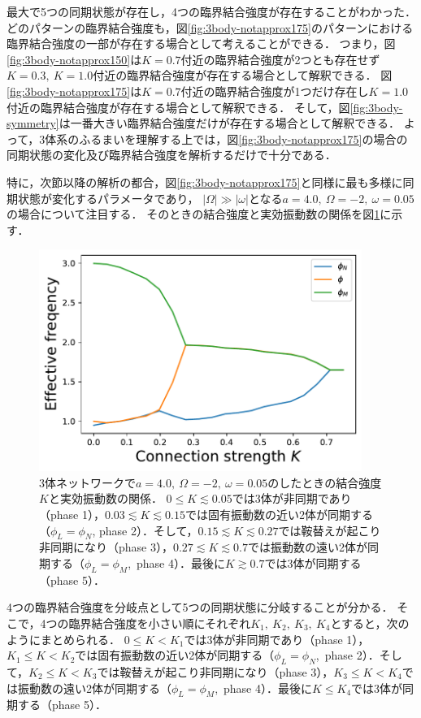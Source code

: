 \documentclass[../main]{subfiles}
\begin{document}
最大で5つの同期状態が存在し，4つの臨界結合強度が存在することがわかった．
どのパターンの臨界結合強度も，図\ref{fig:3body-notapprox175}のパターンにおける臨界結合強度の一部が存在する場合として考えることができる．
つまり，図\ref{fig:3body-notapprox150}は$K=0.7$付近の臨界結合強度が2つとも存在せず$K=0.3,\ K=1.0$付近の臨界結合強度が存在する場合として解釈できる．
図\ref{fig:3body-notapprox175}は$K=0.7$付近の臨界結合強度が1つだけ存在し$K=1.0$付近の臨界結合強度が存在する場合として解釈できる．
そして，図\ref{fig:3body-symmetry}は一番大きい臨界結合強度だけが存在する場合として解釈できる．
よって，3体系のふるまいを理解する上では，図\ref{fig:3body-notapprox175}の場合の同期状態の変化及び臨界結合強度を解析するだけで十分である．

特に，次節以降の解析の都合，図\ref{fig:3body-notapprox175}と同様に最も多様に同期状態が変化するパラメータであり，
$|\Omega|\gg|\omega|$となる$a=4.0,\ \Omega=-2,\ \omega=0.05$の場合について注目する．
そのときの結合強度と実効振動数の関係を図\ref{fig:3body-state}に示す．

\begin{figure}[tbp]
\centering
\includegraphics[width=105mm]{./images/three-body-prob.pdf}
\centering
\caption{3体ネットワークで$a=4.0,\ \Omega=-2,\ \omega=0.05$のしたときの結合強度$K$と実効振動数の関係．
$0\leq K\lesssim 0.05$では3体が非同期であり（phase 1），$0.03\lesssim K\lesssim 0.15$では固有振動数の近い2体が同期する（$\phi_L=\phi_N$, phase 2）．そして，$0.15 \lesssim K\lesssim 0.27$では鞍替えが起こり非同期になり（phase 3），$0.27\lesssim K\lesssim 0.7$では振動数の遠い2体が同期する（$\phi_L=\phi_M$,\ phase 4）．最後に$K\gtrsim 0.7$では3体が同期する（phase 5）．}
\label{fig:3body-state}
\end{figure}

4つの臨界結合強度を分岐点として5つの同期状態に分岐することが分かる．
そこで，4つの臨界結合強度を小さい順にそれぞれ$K_1,\ K_2,\ K_3,\ K_4$とすると，次のようにまとめられる．
$0\leq K<K_1$では3体が非同期であり（phase 1），$K_1\leq K<K_2$では固有振動数の近い2体が同期する（$\phi_L=\phi_N$,\ phase 2）．そして，$K_2\leq K<K_3$では鞍替えが起こり非同期になり（phase 3），$K_3\leq K<K_4$では振動数の遠い2体が同期する（$\phi_L=\phi_M$,\ phase 4）．最後に$K\leq K_4$では3体が同期する（phase 5）．
\end{document}
